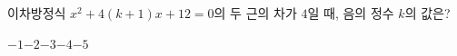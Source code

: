 이차방정식 $x^2+4(k+1)x+12=0$의 두 근의 차가 $4$일 때, 음의 정수 $k$의 값은?
\begin{choices32}{$-1$}{$-2$}{$-3$}{$-4$}{$-5$}\end{choices32}
